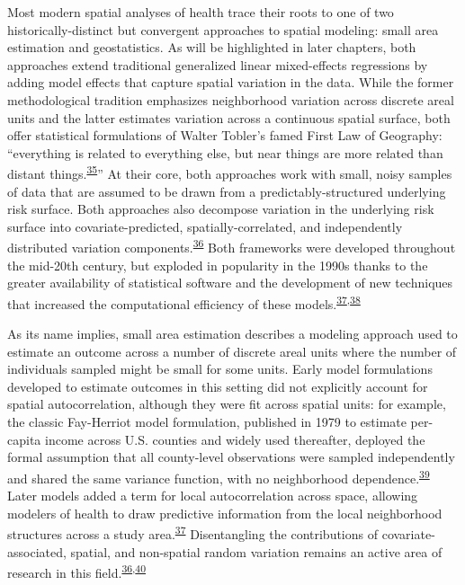 \documentclass[
]{article}
\begin{document}
Most modern spatial analyses of health trace their roots to one of two historically-distinct but convergent approaches to spatial modeling: small area estimation and geostatistics. As will be highlighted in later chapters, both approaches extend traditional generalized linear mixed-effects regressions by adding model effects that capture spatial variation in the data. While the former methodological tradition emphasizes neighborhood variation across discrete areal units and the latter estimates variation across a continuous spatial surface, both offer statistical formulations of Walter Tobler's famed First Law of Geography: ``everything is related to everything else, but near things are more related than distant things.\textsuperscript{\protect\hyperlink{ref-Tobler1970}{35}}'' At their core, both approaches work with small, noisy samples of data that are assumed to be drawn from a predictably-structured underlying risk surface. Both approaches also decompose variation in the underlying risk surface into covariate-predicted, spatially-correlated, and independently distributed variation components.\textsuperscript{\protect\hyperlink{ref-Riebler2016}{36}} Both frameworks were developed throughout the mid-20th century, but exploded in popularity in the 1990s thanks to the greater availability of statistical software and the development of new techniques that increased the computational efficiency of these models.\textsuperscript{\protect\hyperlink{ref-Besag1991}{37},\protect\hyperlink{ref-Lindgren2011}{38}}

As its name implies, small area estimation describes a modeling approach used to estimate an outcome across a number of discrete areal units where the number of individuals sampled might be small for some units. Early model formulations developed to estimate outcomes in this setting did not explicitly account for spatial autocorrelation, although they were fit across spatial units: for example, the classic Fay-Herriot model formulation, published in 1979 to estimate per-capita income across U.S. counties and widely used thereafter, deployed the formal assumption that all county-level observations were sampled independently and shared the same variance function, with no neighborhood dependence.\textsuperscript{\protect\hyperlink{ref-III1979a}{39}} Later models added a term for local autocorrelation across space, allowing modelers of health to draw predictive information from the local neighborhood structures across a study area.\textsuperscript{\protect\hyperlink{ref-Besag1991}{37}} Disentangling the contributions of covariate-associated, spatial, and non-spatial random variation remains an active area of research in this field.\textsuperscript{\protect\hyperlink{ref-Riebler2016}{36},\protect\hyperlink{ref-MacNab2011}{40}}
\end{document}

